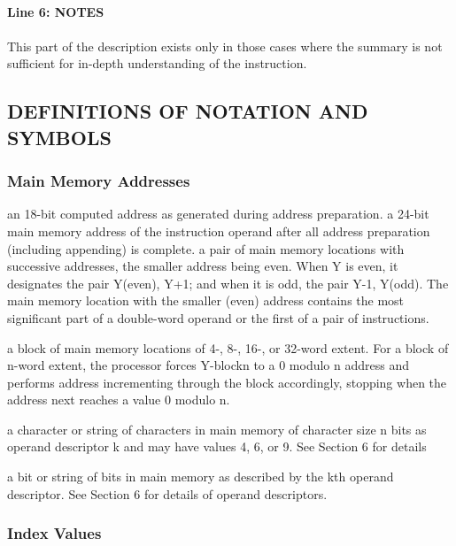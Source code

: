 \paragraph {Line 6: NOTES}
\paragraph {}

This part of the description exists only in those cases where the summary is not sufficient
for in-depth understanding of the instruction.

\subsection{DEFINITIONS OF NOTATION AND SYMBOLS}

\subsubsection{Main Memory Addresses}

 {an 18-bit computed address as generated during address preparation.}
 {a 24-bit main memory address of the instruction operand after all address preparation (including appending) is complete.}
 {a pair of main memory locations with successive addresses, the smaller
address being even. When Y is even, it designates the pair Y(even), Y+1; and
when it is odd, the pair Y-1, Y(odd). The main memory location with the smaller
(even) address contains the most significant part of a double-word operand or
the first of a pair of instructions.}


{a block of main memory locations of 4-, 8-, 16-, or 32-word extent. For a block
of n-word extent, the processor forces Y-blockn to a 0 modulo n address and
performs address incrementing through the block accordingly, stopping when
the address next reaches a value 0 modulo n.}

{a character or string of characters in main memory of character size n bits as
operand descriptor k and may have values 4, 6, or 9. See Section 6 for details}

{a bit or string of bits in main memory as described by the kth operand
descriptor. See Section 6 for details of operand descriptors.}

\subsubsection{Index Values}

